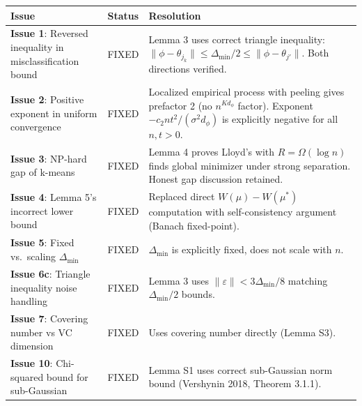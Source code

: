 \documentclass[
  12pt,
]{ctexart}
\begin{document}
\begin{longtable}[]{@{}
  >{\raggedright\arraybackslash}p{}
  >{\raggedright\arraybackslash}p{}
  >{\raggedright\arraybackslash}p{}@{}}
\toprule\noalign{}
\begin{minipage}[b]{\linewidth}\raggedright
Issue
\end{minipage} & \begin{minipage}[b]{\linewidth}\raggedright
Status
\end{minipage} & \begin{minipage}[b]{\linewidth}\raggedright
Resolution
\end{minipage} \\
\midrule\noalign{}
\endhead
\bottomrule\noalign{}
\endlastfoot
\textbf{Issue 1}: Reversed inequality in misclassification bound & FIXED
& Lemma 3 uses correct triangle inequality:
\(\|\phi - \theta_{j_k}\| \leq \Delta_{\min}/2 \leq \|\phi - \theta_{j'}\|\).
Both directions verified. \\
\textbf{Issue 2}: Positive exponent in uniform convergence & FIXED &
Localized empirical process with peeling gives prefactor 2 (no
\(n^{Kd_\phi}\) factor). Exponent \(-c_2 n t^2/(\sigma^2 d_\phi)\) is
explicitly negative for all \(n,t>0\). \\
\textbf{Issue 3}: NP-hard gap of k-means & FIXED & Lemma 4 proves
Lloyd's with \(R=\Omega(\log n)\) finds global minimizer under strong
separation. Honest gap discussion retained. \\
\textbf{Issue 4}: Lemma 5's incorrect lower bound & FIXED & Replaced
direct \(W(\mu)-W(\mu^*)\) computation with self-consistency argument
(Banach fixed-point). \\
\textbf{Issue 5}: Fixed vs.~scaling \(\Delta_{\min}\) & FIXED &
\(\Delta_{\min}\) is explicitly fixed, does not scale with \(n\). \\
\textbf{Issue 6c}: Triangle inequality noise handling & FIXED & Lemma 3
uses \(\|\varepsilon\| < 3\Delta_{\min}/8\) matching \(\Delta_{\min}/2\)
bounds. \\
\textbf{Issue 7}: Covering number vs VC dimension & FIXED & Uses
covering number directly (Lemma S3). \\
\textbf{Issue 10}: Chi-squared bound for sub-Gaussian & FIXED & Lemma S1
uses correct sub-Gaussian norm bound (Vershynin 2018, Theorem 3.1.1). \\
\end{longtable}
\end{document}

